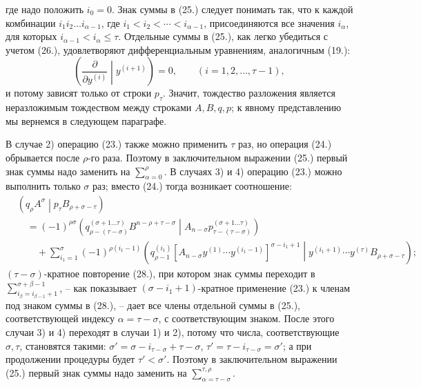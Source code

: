 \documentclass[11pt]{article}
\newcommand{\pair}[2]{\left(#1\middle|#2\right)}
\begin{document}
где надо положить $i_0=0$. Знак суммы в (25.) следует понимать так, что к каждой комбинации $i_1i_2\ldots i_{\alpha-1}$, где $i_1<i_2<\cdots<i_{\alpha-1}$, присоединяются все значения $i_\alpha$, для которых $i_{\alpha-1}<i_\alpha\le\tau$. Отдельные суммы в (25.), как легко убедиться с учетом (26.), удовлетворяют дифференциальным уравнениям, аналогичным (19.):
\begin{equation}
 \left(\frac{\partial}{\partial y^{(i)}}\middle|y^{(i+1)}\right)=0,
 \qquad (i=1,2,\ldots,\tau-1),
\tag{27}
\end{equation}
и потому зависят только от строки $p_\tau$. Значит, тождество разложения является неразложимым тождеством между строками $A,B,q,p$; к явному представлению мы вернемся в следующем параграфе.

В случае 2) операцию (23.) также можно применить $\tau$ раз, но операция (24.) обрывается после $\rho$-го раза. Поэтому в заключительном выражении (25.) первый знак суммы надо заменить на $\sum_{\alpha=0}^{\rho}$. В случаях 3) и 4) операцию (23.) можно выполнить только $\sigma$ раз; вместо (24.) тогда возникает соотношение:
\begin{equation}
\begin{aligned}
&\pair{q_\rho A^\sigma}{p_\tau B_{\rho+\sigma-\tau}}\\
&\quad=(-1)^{\rho\sigma}
\pair{q_{\rho-(\tau-\sigma)}^{(\sigma+1\ldots\tau)}B^{n-\rho+\tau-\sigma}}
{A_{n-\sigma}p_{\tau-(\tau-\sigma)}^{(\sigma+1\ldots\tau)}}\\
&\qquad+\sum_{i_1=1}^{\sigma}(-1)^{\rho(i_1-1)}
\pair{q_{\rho-1}^{(i_1)}
[A_{n-\sigma}y^{(1)}\cdots y^{(i_1-1)}]^{\sigma-i_1+1}}
{y^{(i_1+1)}\cdots y^{(\tau)}B_{\rho+\sigma-\tau}};
\end{aligned}
\tag{28}
\end{equation}
$(\tau-\sigma)$-кратное повторение (28.), при котором знак суммы переходит в $\sum_{i_\beta=i_{\beta-1}+1}^{\sigma+\beta-1}$, -- как показывает $(\sigma-i_1+1)$-кратное применение (23.) к членам под знаком суммы в (28.), -- дает все члены отдельной суммы в (25.), соответствующей индексу $\alpha=\tau-\sigma$, с соответствующим знаком. После этого случаи 3) и 4) переходят в случаи 1) и 2), потому что числа, соответствующие $\sigma,\tau$, становятся такими: $\sigma'=\sigma-i_{\tau-\sigma}+\tau-\sigma$, $\tau'=\tau-i_{\tau-\sigma}=\sigma'$; а при продолжении процедуры будет $\tau'<\sigma'$. Поэтому в заключительном выражении (25.) первый знак суммы надо заменить на $\sum_{\alpha=\tau-\sigma}^{\tau,\rho}$.
\end{document}
